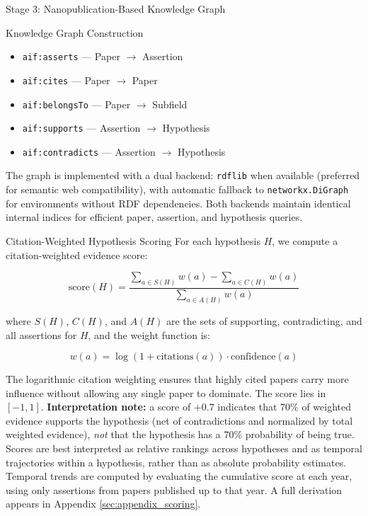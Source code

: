 \documentclass[
  ignorenonframetext,
]{beamer}
\providecommand{\tightlist}{%
  \setlength{\itemsep}{0pt}\setlength{\parskip}{0pt}}
\begin{document}
\begin{frame}[fragile]{Stage 3: Nanopublication-Based Knowledge Graph
\label{sec:methods_kg}}
\begin{block}{Knowledge Graph Construction}
\begin{itemize}
\tightlist
\item
  \texttt{aif:asserts} --- Paper \(\to\) Assertion
\item
  \texttt{aif:cites} --- Paper \(\to\) Paper
\item
  \texttt{aif:belongsTo} --- Paper \(\to\) Subfield
\item
  \texttt{aif:supports} --- Assertion \(\to\) Hypothesis
\item
  \texttt{aif:contradicts} --- Assertion \(\to\) Hypothesis
\end{itemize}

The graph is implemented with a dual backend: \texttt{rdflib}
\citep{rdflib2023} when available (preferred for semantic web
compatibility), with automatic fallback to \texttt{networkx.DiGraph} for
environments without RDF dependencies. Both backends maintain identical
internal indices for efficient paper, assertion, and hypothesis queries.
\end{block}

\begin{block}{Citation-Weighted Hypothesis Scoring}
\protect{}\label{citation-weighted-hypothesis-scoring}
For each hypothesis \(H\), we compute a citation-weighted evidence
score:

\begin{equation}
\text{score}(H) = \frac{\sum_{a \in S(H)} w(a) - \sum_{a \in C(H)} w(a)}{\sum_{a \in A(H)} w(a)} \label{eq:score}
\end{equation}

where \(S(H)\), \(C(H)\), and \(A(H)\) are the sets of supporting,
contradicting, and all assertions for \(H\), and the weight function is:

\begin{equation}
w(a) = \log(1 + \text{citations}(a)) \cdot \text{confidence}(a) \label{eq:weight}
\end{equation}

The logarithmic citation weighting ensures that highly cited papers
carry more influence without allowing any single paper to dominate. The
score lies in \([-1, 1]\). \textbf{Interpretation note:} a score of
\(+0.7\) indicates that 70\% of weighted evidence supports the
hypothesis (net of contradictions and normalized by total weighted
evidence), \emph{not} that the hypothesis has a 70\% probability of
being true. Scores are best interpreted as relative rankings across
hypotheses and as temporal trajectories within a hypothesis, rather than
as absolute probability estimates. Temporal trends are computed by
evaluating the cumulative score at each year, using only assertions from
papers published up to that year. A full derivation appears in Appendix
\ref{sec:appendix_scoring}.
\end{block}


\end{frame}
\end{document}
